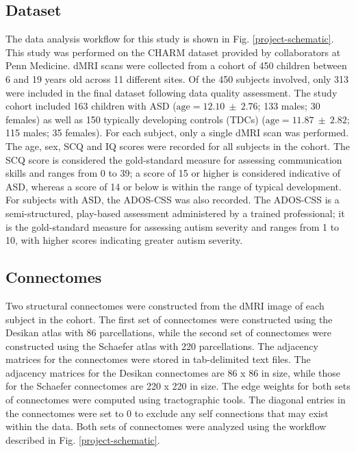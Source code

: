 \documentclass[11pt,conference]{IEEEtran}
\begin{document}
\subsection*{\textbf{Dataset}}
    The data analysis workflow for this study is shown in Fig. \ref{project-schematic}.
    This study was performed on the CHARM dataset provided by collaborators at Penn 
    Medicine. dMRI scans were collected from a cohort of 450 children between 6 and 19 
    years old across 11 different sites. Of the 450 subjects involved, only 313 were 
    included in the final dataset following data quality assessment. The study cohort 
    included 163 children with ASD ($\text{age}=12.10~\pm~2.76$; 133 males; 30 females) 
    as well as 150 typically developing controls (TDCs) ($\text{age}=11.87~\pm~2.82$; 
    115 males; 35 females). For each subject, only a single dMRI scan was performed. 
    The age, sex, SCQ and IQ scores were recorded for all subjects in the cohort. The 
    SCQ score is considered the gold-standard measure for assessing communication skills
    and ranges from 0 to 39; a score of 15 or higher is considered indicative of ASD, 
    whereas a score of 14 or below is within the range of typical development. For 
    subjects with ASD, the ADOS-CSS was also recorded. The ADOS-CSS is a semi-structured, 
    play-based assessment administered by a trained professional; it is the gold-standard 
    measure for assessing autism severity and ranges from 1 to 10, with higher scores
    indicating greater autism severity.

\subsection*{\textbf{Connectomes}}
    Two structural connectomes were constructed from the dMRI image of each subject in the 
    cohort. The first set of connectomes were constructed using the Desikan atlas with
    86 parcellations, while the second set of connectomes were constructed using the 
    Schaefer atlas with 220 parcellations. The adjacency matrices for the connectomes were 
    stored in tab-delimited text files. The adjacency matrices for the Desikan connectomes 
    are 86 x 86 in size, while those for the Schaefer connectomes are 220 x 220 in size.
    The edge weights for both sets of connectomes were computed using tractographic tools.
    The diagonal entries in the connectomes were set to 0 to exclude any self connections 
    that may exist within the data. Both sets of connectomes were analyzed using the 
    workflow described in Fig. \ref{project-schematic}.
\end{document}
